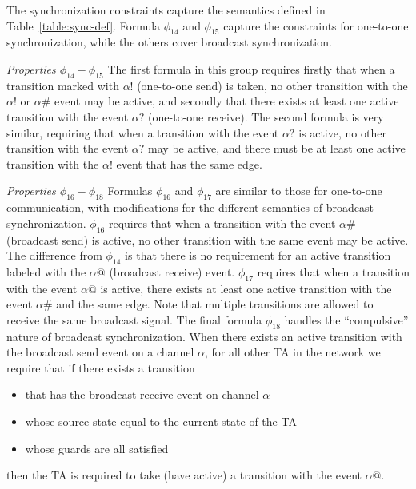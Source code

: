 \documentclass[a4paper,11pt]{report}
\theoremstyle{definition}
\begin{document}
The synchronization constraints capture the semantics defined in
Table~\ref{table:sync-def}. Formula $\phi_{14}$ and $\phi_{15}$ capture the
constraints for one-to-one synchronization, while the others cover broadcast
synchronization.

\emph{Properties $\phi_{14}-\phi_{15}$} The first formula in this group requires
firstly that when a transition marked with $\alpha{!}$ (one-to-one send) is
taken, no other transition with the $\alpha{!}$ or $\alpha\#$ event may be
active, and secondly that there exists at least one active transition with the
event $\alpha{?}$ (one-to-one receive). The second formula is very similar,
requiring that when a transition with the event $\alpha{?}$ is active, no other
transition with the event $\alpha{?}$ may be active, and there must be at least
one active transition with the $\alpha{!}$ event that has the same edge.

\emph{Properties $\phi_{16}-\phi_{18}$} Formulas $\phi_{16}$ and $\phi_{17}$ are
similar to those for one-to-one communication, with modifications for the
different semantics of broadcast synchronization. $\phi_{16}$ requires that when
a transition with the event $\alpha\#$ (broadcast send) is active, no other
transition with the same event may be active. The difference from $\phi_{14}$ is
that there is no requirement for an active transition labeled with the
$\alpha @$ (broadcast receive) event. $\phi_{17}$ requires that when a transition
with the event $\alpha @$ is active, there exists at least one active transition
with the event $\alpha\#$ and the same edge. Note that multiple transitions are
allowed to receive the same broadcast signal. The final formula $\phi_{18}$
handles the ``compulsive'' nature of broadcast synchronization. When there
exists an active transition with the broadcast send event on a channel $\alpha$,
for all other TA in the network we require that if there exists a transition
\begin{itemize}
  \item that has the broadcast receive event on channel $\alpha$
  \item whose source state equal to the current state of the TA
  \item whose guards are all satisfied
\end{itemize}
then the TA is required to take (have active) a transition with the event
$\alpha @$.

\end{document}
